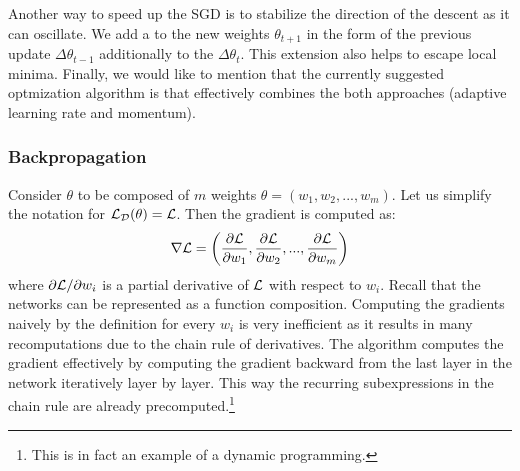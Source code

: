     Another way to speed up the SGD is to stabilize the direction of the descent as
    it can oscillate. We add a  to the new weights $\theta_{t+1}$ in
    the form of the previous update $\Delta\theta_{t-1}$ additionally to the
$\Delta\theta_{t}$. This extension also helps to escape local minima. Finally,
    we would like to mention that the currently suggested optmization algorithm is
     \cite{adam} that effectively combines the both approaches (adaptive
    learning rate and momentum).

    \subsubsection{Backpropagation}
    Consider $\theta$ to be composed of $m$ weights $\theta = (w_1, w_2, ..., w_m)$.
    Let us simplify the notation for $\mathcal{L}_\mathcal{D}(\theta) = \mathcal{L}$. Then the
    gradient is computed as:
    $$
        \grad = \left(\pd{1}, \pd{2}, ..., \pd{m}\right)
    $$
    where $\partial \mathcal{L} / \partial w_i$ is a partial derivative of $\mathcal{L}$ with
    respect to $w_i$. Recall that the networks can be represented as a function
    composition. Computing the gradients naively by the definition for every $w_i$
    is very inefficient as it results in many recomputations due to the chain rule
    of derivatives. The  algorithm \cite{backprop} computes the
    gradient effectively by computing the gradient backward from the last layer in
    the network iteratively layer by layer. This way the recurring subexpressions in
    the chain rule are already precomputed.\footnote{This is in fact an example of a
        dynamic programming.}


